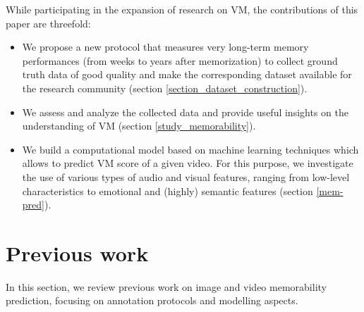 \documentclass[sigconf]{acmart}
\begin{document}
While participating in the expansion of research on VM, the contributions of this paper are threefold:
\begin{itemize}
	\item We propose a new protocol that measures very long-term memory performances (from weeks to years after memorization) to collect ground truth data of good quality and make the corresponding dataset available for the research community (section \ref{section_dataset_construction}).
	\item We assess and analyze the collected data and provide useful insights on the understanding of VM (section \ref{study_memorability}).
	\item We build a computational model based on machine learning techniques which allows to predict VM score of a given video. For this purpose, we investigate the use of various types of audio and visual features, ranging from low-level characteristics to emotional and (highly) semantic features (section \ref{mem-pred}).
\end{itemize}

\section{Previous work}
In this section, we review previous work on image and video memorability prediction, focusing on annotation protocols and modelling aspects.
\end{document}
